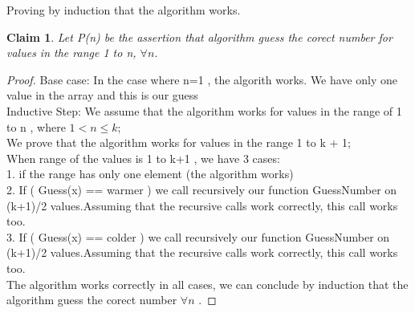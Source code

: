 \documentclass[11 pt]{article}
\newtheorem{claim}[theorem]{Claim}
\begin{document}
Proving by induction that the algorithm works.
\begin{claim}
Let P(n) be the assertion that algorithm guess the corect number for values in the range 1 to  n, $\forall n $.
\end {claim}
\begin {proof}


Base case: In the case where n=1 , the algorith works. We have only one value in the array and this is our guess\\

Inductive Step: We assume that the algorithm works for values in the range of  1 to n ,  where  $1 < n  \leq k$;\\
We prove that the algorithm works for values in the range 1 to  k + 1;\\
When range  of the values  is  1 to k+1 , we have 3 cases:\\
1. if the range has only one element (the algorithm works)\\
2. If ( Guess(x) == warmer ) we call recursively our function GuessNumber on  (k+1)/2 values.Assuming that the recursive calls work correctly, this call works too. \\
3. If ( Guess(x) == colder ) we call recursively our function GuessNumber on  (k+1)/2 values.Assuming that the recursive calls work correctly, this call works too. \\
The algorithm works correctly in all cases, we can conclude by induction that the algorithm guess the corect number $\forall n$ .
\end {proof}
\end{document}
